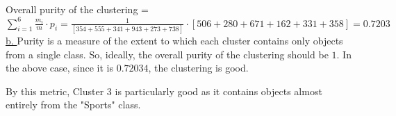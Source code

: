 \documentclass[11pt]{article}
\begin{document}
Overall purity of the clustering = $\sum^{6}_{i = 1} \frac{m_i}{m} \cdot p_i = \frac{1}{[354 + 555 + 341 + 943 + 273 + 738]} \cdot [506 + 280 + 671 + 162 + 331 + 358] = 0.7203$
\\

\underline{b. }
Purity is a measure of the extent to which each cluster contains only objects from a single class. So, ideally, the overall purity of the clustering should be $1$. In the above case, since it is $0.72034$, the clustering is good.

By this metric, Cluster 3 is particularly good as it contains objects almost entirely from the "Sports" class.
	
	
	
\end{document}

